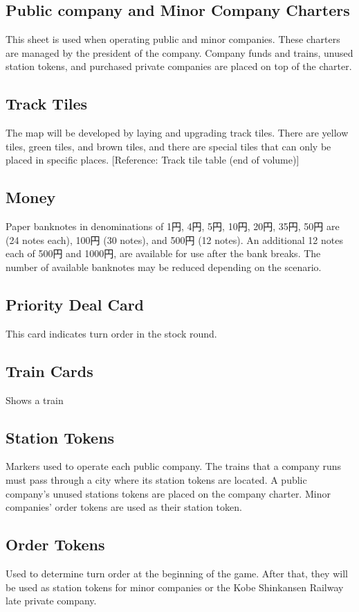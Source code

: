 \documentclass{article}
\begin{document}
\begin{CJK}{UTF8}{min}
\begin{multicols}{2}
\subsection{Public company and Minor Company Charters}
This sheet is used when operating public and minor companies.  These
charters are managed by the president of the company. Company funds
and trains, unused station tokens, and purchased private companies are
placed on top of the charter.


\subsection{Track Tiles}
The map will be developed by laying and upgrading track tiles. There
are yellow tiles, green tiles, and brown tiles, and there are special
tiles that can only be placed in specific places. [Reference: Track tile
table (end of volume)]


\subsection{Money}
Paper banknotes in denominations of 1円, 4円, 5円, 10円, 20円, 35円,
50円 are (24 notes each), 100円 (30 notes), and 500円 (12 notes). An
additional 12 notes each of 500円 and 1000円, are available for use
after the bank breaks. The number of available banknotes may be
reduced depending on the scenario.

\subsection{Priority Deal Card}
This card indicates turn order in the stock round.


\subsection{Train Cards}
Shows a train

\subsection{Station Tokens}
Markers used to operate each public company. The trains that a company
runs must pass through a city where its station tokens are located. A
public company's unused stations tokens are placed on the company
charter. Minor companies' order tokens are used as their station
token.


\subsection{Order Tokens}
Used to determine turn order at the beginning of the game. After
that, they will be used as station tokens for minor companies or the
Kobe Shinkansen Railway late private company.




\end{multicols}
\end{CJK}
\end{document}
